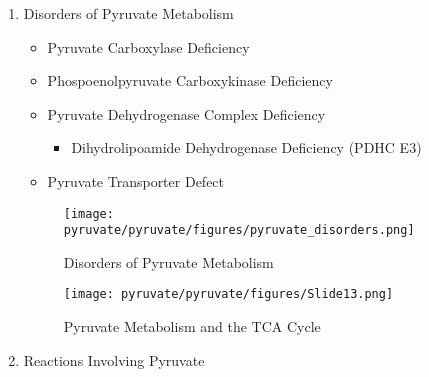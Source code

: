 \documentclass{scrartcl}
\begin{document}
\begin{center}
\setatomsep{1.8em}
\hspace{20}
\end{center}
\begin{enumerate}
\item Disorders of Pyruvate Metabolism
\label{sec:org393d8cc}
\begin{itemize}
\item Pyruvate Carboxylase Deficiency
\item Phospoenolpyruvate Carboxykinase Deficiency
\item Pyruvate Dehydrogenase Complex Deficiency
\begin{itemize}
\item Dihydrolipoamide Dehydrogenase Deficiency (PDHC E3)
\end{itemize}
\item Pyruvate Transporter Defect
\end{itemize}

\begin{figure}[htbp]
\centering
\texttt{[image: pyruvate/pyruvate/figures/pyruvate\_disorders.png]}
\caption[TCA]{\label{fig:orge5f6f1d}Disorders of Pyruvate Metabolism}
\end{figure}


\begin{figure}[htbp]
\centering
\texttt{[image: pyruvate/pyruvate/figures/Slide13.png]}
\caption[TCA]{\label{fig:org37b596d}Pyruvate Metabolism and the TCA Cycle}
\end{figure}

\item Reactions Involving Pyruvate
\label{sec:orgc0d2479}





\end{enumerate}
\end{document}
